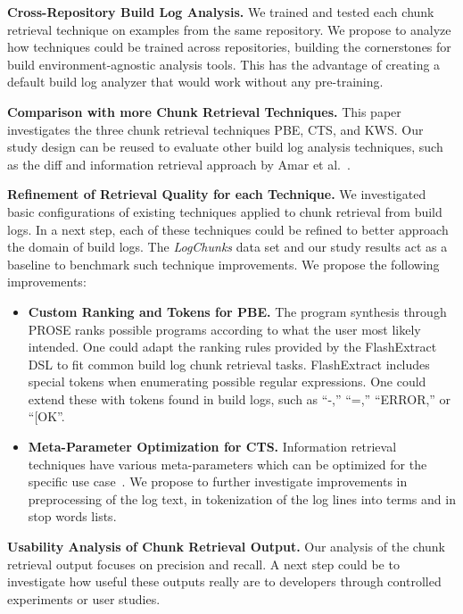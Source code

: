 \textbf{Cross-Repository Build Log Analysis.}
We trained and
tested each chunk retrieval technique on examples from the same
repository.
We propose to analyze how techniques could be trained
across repositories, building the cornerstones for build
environment-agnostic analysis tools.
This has the advantage of creating
a default build log analyzer that would work without any pre-training.

\textbf{Comparison with more Chunk Retrieval Techniques.}
This
paper investigates the three chunk retrieval techniques PBE, CTS, and
KWS\@.
Our study design can be reused to evaluate other build log
analysis techniques, such as the diff and information retrieval
approach by Amar et al.~\cite{amar2019mining}.

\textbf{Refinement of Retrieval Quality for each Technique.} We
investigated basic configurations of existing techniques applied to
chunk retrieval from build logs.
In a next step, each of these
techniques could be refined to better approach the domain of build
logs.
The \emph{LogChunks} data set and our study results act as a
baseline to benchmark such technique improvements.
We propose the
following improvements:
\begin{itemize}[leftmargin=0.4cm]
  \item \textbf{Custom Ranking and Tokens for PBE.} The program
  synthesis through PROSE ranks possible programs according to
  what the user most likely intended.
  One could adapt the ranking
  rules provided by the FlashExtract DSL to fit common build log
  chunk retrieval tasks.
  FlashExtract includes special tokens when
  enumerating possible regular expressions.
  One could extend these
  with tokens found in build logs, such as ``-,''
	``=,'' ``ERROR,''
  or ``[OK''.
  \item \textbf{Meta-Parameter Optimization for CTS.} Information
  retrieval techniques have various meta-parameters which can be
  optimized for the specific use
  case~\cite{panichella2016parameterizing}.
  We propose to further
  investigate improvements in preprocessing of the log text, in
  tokenization of the log lines into terms and in stop words
  lists.
\end{itemize}

\textbf{Usability Analysis of Chunk Retrieval Output.}
Our
analysis of the chunk retrieval output focuses on
precision and recall.
A next step could be to investigate how useful these
outputs really are to developers through controlled experiments or
user studies.

